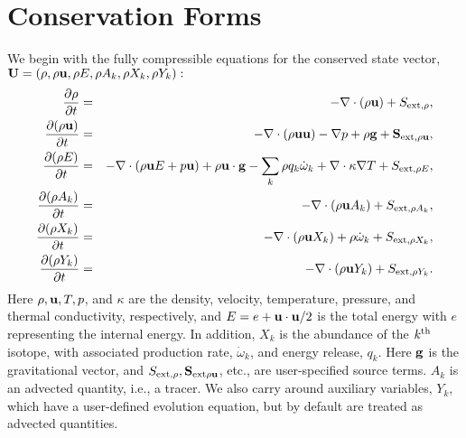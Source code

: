 \section{Conservation Forms}
We begin with the fully compressible equations for the conserved state vector, 
${\bf U} = (\rho, \rho {\bf u}, \rho E, \rho A_k, \rho X_k, \rho Y_k):$
\begin{eqnarray}
\frac{\partial \rho}{\partial t} &=& - \nabla \cdot (\rho {\bf u}) + S_{{\rm ext},\rho}, \\
\frac{\partial (\rho {\bf u})}{\partial t} &=& - \nabla \cdot (\rho {\bf u} {\bf u}) - \nabla p +\rho {\bf g} + {\bf S}_{{\rm ext},\rho{\bf u}}, \\
\frac{\partial (\rho E)}{\partial t} &=& - \nabla \cdot (\rho {\bf u} E + p {\bf u}) + \rho {\bf u} \cdot {\bf g} - \sum_k {\rho q_k \dot\omega_k} + \nabla\cdot\kappa\nabla T + S_{{\rm ext},\rho E}, \\
\frac{\partial (\rho A_k)}{\partial t} &=& - \nabla \cdot (\rho {\bf u} A_k) + S_{{\rm ext},\rho A_k}, \\
\frac{\partial (\rho X_k)}{\partial t} &=& - \nabla \cdot (\rho {\bf u} X_k) + \rho \dot\omega_k + S_{{\rm ext},\rho X_k}, \\
\frac{\partial (\rho Y_k)}{\partial t} &=& - \nabla \cdot (\rho {\bf u} Y_k) + S_{{\rm ext},\rho Y_k}.\label{eq:compressible-equations}
\end{eqnarray}
Here $\rho, {\bf u}, T, p$, and $\kappa$ are the density, velocity,
temperature, pressure, and thermal conductivity, respectively, and $E
= e + {\bf u} \cdot {\bf u} / 2$ is the total energy with $e$ representing the
internal energy.  In addition, $X_k$ is the abundance of the $k^{\rm
  th}$ isotope, with associated production rate, $\dot\omega_k$, and
energy release, $q_k$.  Here ${\bf g}$ is the gravitational vector, and
$S_{{\rm ext},\rho}, {\bf S}_{{\rm ext}\rho{\bf u}}$, etc., are user-specified
source terms.  $A_k$ is an advected quantity, i.e., a tracer.  We also
carry around auxiliary variables, $Y_k$, which have a user-defined
evolution equation, but by default are treated as advected quantities.

